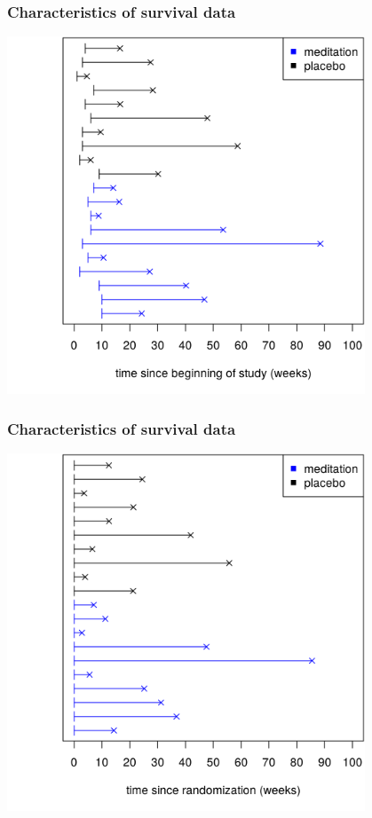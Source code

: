 \documentclass[12pt, 
hyperref={colorlinks=true, linkcolor=blue, urlcolor=cyan},dvipsnames]{beamer}
\begin{document}
\begin{frame}
\frametitle{Characteristics of survival data}
\centering
\includegraphics[width=0.8\textwidth]{figs/meditation_observed_study_time.png}
\end{frame}

\begin{frame}
\frametitle{Characteristics of survival data}
\centering
\includegraphics[width=0.8\textwidth]{figs/meditation_observed_rand_time.png}
\end{frame}
\end{document}
